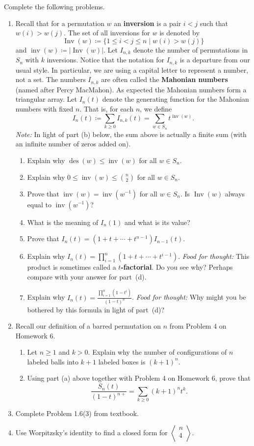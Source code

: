 \documentclass[11pt]{article}%
\theoremstyle{definition}
\DeclareMathOperator{\des}{des}
\DeclareMathOperator{\Inv}{Inv}
\DeclareMathOperator{\inv}{inv}
\newcommand{\euler}[2]{
  \displaystyle \left\langle\begin{matrix}#1  \\#2  \\ \end{matrix}\right\rangle}
\begin{document}
Complete the following problems. 
\begin{enumerate}
\item Recall that for a permutation $w$ an \textbf{inversion} is a pair $i<j$ such that $w(i)>w(j)$.  The set of all inversions for $w$ is denoted by
\[
\Inv(w)\coloneqq \{1\leq i<j\leq n\mid w(i)>w(j)\}
\] 
and $\inv(w)\coloneqq |\Inv(w)|$. Let $I_{n,k}$ denote the number of permutations in $S_n$ with $k$ inversions.  Notice that the notation for $I_{n,k}$ is a departure from our usual style.  In particular, we are using a capital letter to represent a number, not a set. The numbers $I_{n,k}$ are often called the \textbf{Mahonian numbers} (named after Percy MacMahon). As expected the Mahonian numbers form a triangular array. Let $I_n(t)$ denote the generating function for the Mahonian numbers with fixed $n$. That is, for each $n$, we define
\[
I_n(t)\coloneqq \sum_{k\geq 0}I_{n,k}(t)=\sum_{w\in S_n} t^{\inv(w)}.
\]
\emph{Note:} In light of part (b) below, the sum above is actually a finite sum (with an infinite number of zeros added on).
\begin{enumerate}
\item Explain why $\des(w)\leq \inv(w)$ for all $w\in S_n$.
\item Explain why $0\leq \inv(w)\leq \binom{n}{2}$ for all $w\in S_n$.
\item Prove that $\inv(w)=\inv(w^{-1})$ for all $w\in S_n$. Is $\Inv(w)$ always equal to $\inv(w^{-1})$?
\item What is the meaning of $I_n(1)$ and what is its value?
\item Prove that $I_n(t)=(1+t+\cdots +t^{n-1})I_{n-1}(t)$.
\item Explain why $I_n(t)=\prod_{i=1}^n (1+t+\cdots +t^{i-1})$. \emph{Food for thought:} This product is sometimes called a \textbf{$t$-factorial}. Do you see why? Perhaps compare with your answer for part~(d).
\item Explain why $\displaystyle I_n(t)=\frac{\prod_{i=1}^n(1-t^i)}{(1-t)^n}$. \emph{Food for thought:} Why might you be bothered by this formula in light of part~(d)?
\end{enumerate}
\item Recall our definition of a barred permutation on $n$ from Problem 4 on Homework 6.
\begin{enumerate}
\item Let $n\geq 1$ and $k>0$. Explain why the number of configurations of $n$ labeled balls into $k+1$ labeled boxes is $(k+1)^n$.
\item Using part (a) above together with Problem 4 on Homework 6, prove that
\[
\frac{S_n(t)}{(1-t)^{n+}}=\sum_{k\geq 0}(k+1)^nt^k.
\]
\end{enumerate}
\item Complete Problem 1.6(3) from textbook.
\item Use Worpitzsky's identity to find a closed form for $\euler{n}{4}$.
\end{enumerate}
\end{document}
